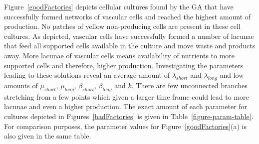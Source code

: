 Figure~\ref{goodFactories} depicts cellular cultures found by the GA that have
successfully formed networks of vascular cells and reached the highest amount of
production. No patches of yellow non-producing cells are present in these cell
cultures. As depicted, vascular cells have successfully formed a number of lacunae
that feed all supported cells available in the culture and move waste and products
away. More lacunae of vascular cells means availability of nutrients to more
supported cells and therefore, higher production. Investigating the parameters
leading to these solutions reveal an average amount of $\lambda_{short}$ and
$\lambda_{long}$ and low amounts of $\mu_{short}$, $\mu_{long}$, $\beta_{short}$,
$\beta_{long}$ and $k$. There are few unconnected branches stretching from a few
points which given a larger time frame could lead to more lacunae and even a higher
production. The exact amount of each parameter for cultures depicted in
Figures~\ref{badFactories} is given in Table~\ref{figure-param-table}. For comparison
purposes, the parameter values for Figure~\ref{goodFactories}(a) is also given in the
same table.

